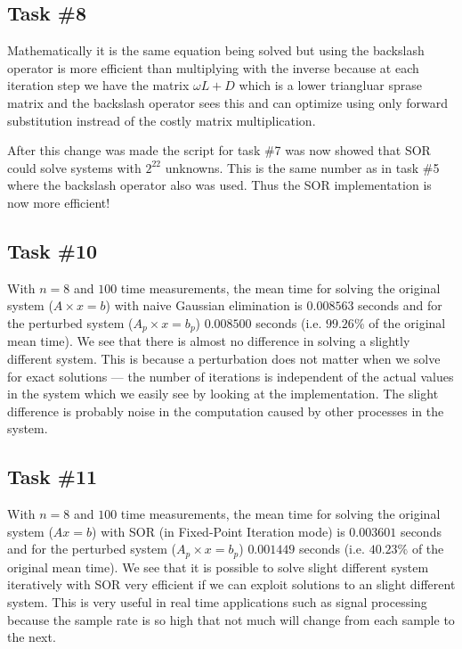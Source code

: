 \documentclass[10pt, a4paper]{article}
\begin{document}
\subsection{Task \#8}
Mathematically it is the same equation being solved but using the backslash operator is more efficient than multiplying with the inverse because at each iteration step we have the matrix $\omega L + D$ which is a lower triangluar sprase matrix and the backslash operator sees this and can optimize using only forward substitution instread of the costly matrix multiplication.

After this change was made the script for task \#7 was now showed that SOR could solve systems with $2^{22}$ unknowns. This is the same number as in task \#5 where the backslash operator also was used. Thus the SOR implementation is now more efficient!

\subsection{Task \#10}
With $n=8$ and $100$ time measurements, the mean time for solving the original system ($A\times x=b$) with naive Gaussian elimination is $0.008563$ seconds  and for the perturbed system ($A_p\times x=b_p$) $0.008500$ seconds (i.e. $99.26\%$ of the original mean time). We see that there is almost no difference in solving a slightly different system. This is because a perturbation does not matter when we solve for exact solutions --- the number of iterations is independent of the actual values in the system which we easily see by looking at the implementation. The slight difference is probably noise in the computation caused by other processes in the system.

\subsection{Task \#11} \label{sub+11}
With $n=8$ and $100$ time measurements, the mean time for solving the original system ($Ax=b$) with SOR (in Fixed-Point Iteration mode) is $0.003601$ seconds and for the perturbed system ($A_p\times x=b_p$) $0.001449$ seconds (i.e. $40.23\%$ of the original mean time). We see that it is possible to solve slight different system iteratively with SOR very efficient if we can exploit solutions to an slight different system. This is very useful in real time applications such as signal processing because the sample rate is so high that not much will change from each sample to the next.
\end{document}
